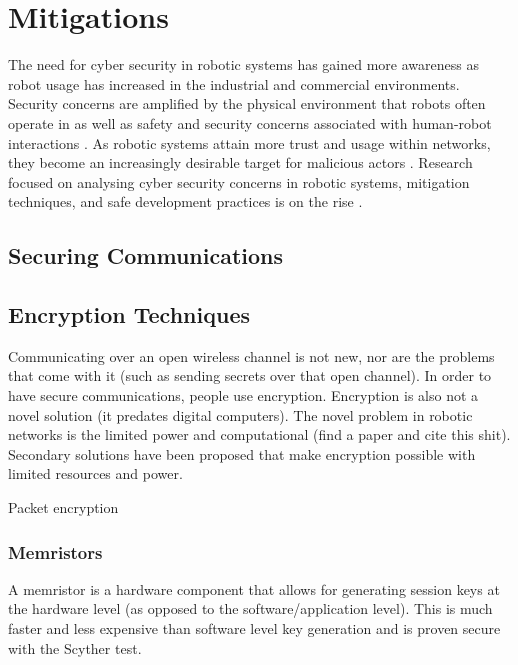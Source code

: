 
\section{Mitigations}
    The need for cyber security in robotic systems has gained more awareness as robot usage has increased in the industrial and commercial environments. Security concerns are amplified by the physical environment that robots often operate in as well as safety and security concerns associated with human-robot interactions \cite{Cornelius}.  As robotic systems attain more trust and usage within networks, they become an increasingly desirable target for malicious actors \cite{Archibald2017ASO, Cornelius}. Research focused on analysing cyber security concerns in robotic systems, mitigation techniques, and safe development practices is on the rise \cite{article:Martin}.  

\subsection{Securing Communications}
    
\subsection{Encryption Techniques}
Communicating over an open wireless channel is not new, nor are the problems that come with it (such as sending secrets over that open channel). In order to have secure communications, people use encryption. Encryption is also not a novel solution (it predates digital computers). The novel problem in robotic networks is the limited power and computational (find a paper and cite this shit). Secondary solutions have been proposed that make encryption possible with limited resources and power. 


Packet encryption\cite{ALAZZAM20188}

\subsubsection{Memristors}
A memristor is a hardware component that allows for generating session keys at the hardware level (as opposed to the software/application level)\cite{abunahla17}. This is much faster and less expensive than software level key generation and is proven secure with the Scyther test\cite{abunahla17}.

